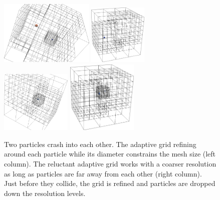 \documentclass[times,12pt]{article}
\begin{document}
\begin{figure}
 \begin{center}
  \includegraphics[width=0.4\textwidth]{experiments/two-bodies/visualisation/adaptive-grid00.png}
  \hspace{1.1cm}
  \includegraphics[width=0.25\textwidth]{experiments/two-bodies/visualisation/reluctant-adaptive-grid00.png}
  \\
  \includegraphics[width=0.3\textwidth]{experiments/two-bodies/visualisation/adaptive-grid02.png}
  \hspace{1.1cm}
  \includegraphics[width=0.3\textwidth]{experiments/two-bodies/visualisation/reluctant-adaptive-grid02.png}
 \end{center}
 \caption{
   Two particles crash into each other.
   The adaptive grid refining around each particle while its diameter
   constrains the mesh size (left column).
   The reluctant adaptive grid works with a coarser resolution as long
   as particles are far away from each other (right column).
   Just before they collide, the grid is refined and particles are dropped down
   the resolution levels.
 }
 \label{figure:adaptive-vs-reluctant-grid}
\end{figure}
\end{document}
